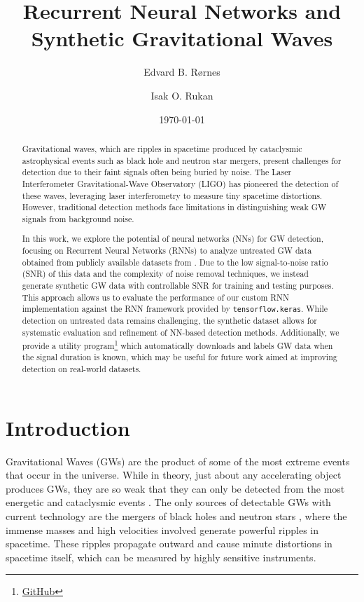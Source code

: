 \documentclass[%
reprint,
amsmath,amssymb,
aps,
]{revtex4-2}
\begin{document}
	
\title{Recurrent Neural Networks and Synthetic Gravitational Waves}
\author{Edvard B. Rørnes}
\author{Isak O. Rukan}
\date{\today}

\begin{abstract}
	Gravitational waves, which are ripples in spacetime produced by cataclysmic astrophysical events such as black hole and neutron star mergers, present challenges for detection due to their faint signals often being buried by noise. The Laser Interferometer Gravitational-Wave Observatory (LIGO) has pioneered the detection of these waves, leveraging laser interferometry to measure tiny spacetime distortions. However, traditional detection methods face limitations in distinguishing weak GW signals from background noise.
	
	In this work, we explore the potential of neural networks (NNs) for GW detection, focusing on Recurrent Neural Networks (RNNs) to analyze untreated GW data obtained from publicly available datasets from \cite{gwosc}. Due to the low signal-to-noise ratio (SNR) of this data and the complexity of noise removal techniques, we instead generate synthetic GW data with controllable SNR for training and testing purposes. This approach allows us to evaluate the performance of our custom RNN implementation against the RNN framework provided by \texttt{tensorflow.keras}. While detection on untreated data remains challenging, the synthetic dataset allows for systematic evaluation and refinement of NN-based detection methods. Additionally, we provide a utility program\footnote{\href{https://github.com/EdvardRornes/FYS-STK4155/tree/main/Project3}{GitHub}} which automatically downloads and labels GW data when the signal duration is known, which may be useful for future work aimed at improving detection on real-world datasets.
\end{abstract}

\maketitle

\section{Introduction}
Gravitational Waves (GWs) are the product of some of the most extreme events that occur in the universe. While in theory, just about any accelerating object produces GWs, they are so weak that they can only be detected from the most energetic and cataclysmic events \cite{ligo_gw_sources}. The only sources of detectable GWs with current technology are the mergers of black holes and neutron stars \cite{LIGOScientific:2007fwp}, where the immense masses and high velocities involved generate powerful ripples in spacetime. These ripples propagate outward and cause minute distortions in spacetime itself, which can be measured by highly sensitive instruments.
\end{document}

